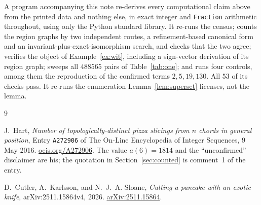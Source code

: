\documentclass[11pt]{amsart}
\theoremstyle{definition}
\theoremstyle{remark}
\begin{document}
A program accompanying this note re-derives every computational claim above from the
printed data and nothing else, in exact integer and \texttt{Fraction} arithmetic
throughout, using only the Python standard library. It re-runs the census; counts the
region graphs by two independent routes, a refinement-based canonical form and an
invariant-plus-exact-iso\-morphism search, and checks that the two agree; verifies the
object of Example~\ref{ex:wit}, including a sign-vector derivation of its region graph;
sweeps all $488565$ pairs of Table~\ref{tab:one}; and runs four controls, among them the
reproduction of the confirmed terms $2,5,19,130$. All $53$ of its checks pass. It re-runs
the enumeration Lemma~\ref{lem:superset} licenses, not the lemma.

\begin{thebibliography}{9}

J.~Hart, \emph{Number of topologically-distinct pizza slicings from $n$ chords in general
position}, Entry \texttt{A272906} of The On-Line Encyclopedia of Integer Sequences,
9 May 2016. \href{https://oeis.org/A272906}{oeis.org/A272906}. The value $a(6)=1814$ and
the ``unconfirmed'' disclaimer are his; the quotation in Section~\ref{sec:counted} is
comment~1 of the entry.

D.~Cutler, A.~Karlsson, and N.~J.~A. Sloane, \emph{Cutting a pancake with an exotic
knife}, arXiv:2511.15864v4, 2026.
\href{https://arxiv.org/abs/2511.15864}{arXiv:2511.15864}.

\end{thebibliography}
\end{document}

